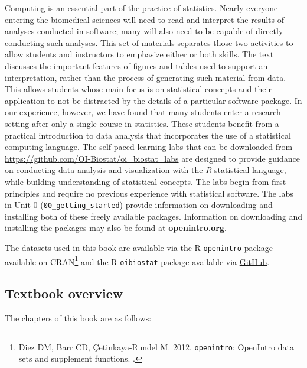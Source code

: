 Computing is an essential part of the practice of statistics.  Nearly everyone entering the biomedical sciences will need to read and interpret the results of analyses conducted in software; many will also need to be capable of directly conducting such analyses. This set of materials separates those two activities to allow students and instructors to emphasize either or both skills. The text discusses the important features of figures and tables used to support an interpretation, rather than the process of generating such material from data. This allows students whose main focus is on statistical concepts and their application to not be distracted by the details of a particular software package. In our experience, however, we have found that many students enter a research setting after only a single course in statistics. These students benefit from a practical introduction to data analysis that incorporates the use of a statistical computing language. The self-paced learning labs that can be downloaded from \url{https://github.com/OI-Biostat/oi_biostat_labs} are designed to  provide guidance on conducting data analysis and visualization with the \textsl{R} statistical language, while building understanding of statistical concepts. The labs begin from first principles and require no previous experience with statistical software. The labs in Unit 0 (\texttt{00\_getting\_started}) provide information on downloading and installing both of these freely available packages. Information on downloading and installing the packages may also be found at \href{http://www.openintro.org}{\color{black}\textbf{openintro.org}}. 

The datasets used in this book are available via the \textsf{R} \texttt{openintro} package available on CRAN\footnote{Diez DM, Barr CD, \c{C}etinkaya-Rundel M. 2012. \texttt{openintro}: OpenIntro data sets and supplement functions. .}  and the \textsf{R} \texttt{oibiostat} package available via \href{<https://github.com/OI-Biostat/oi_biostat_data>}{GitHub}.

\subsection*{Textbook overview}

The chapters of this book are as follows:

